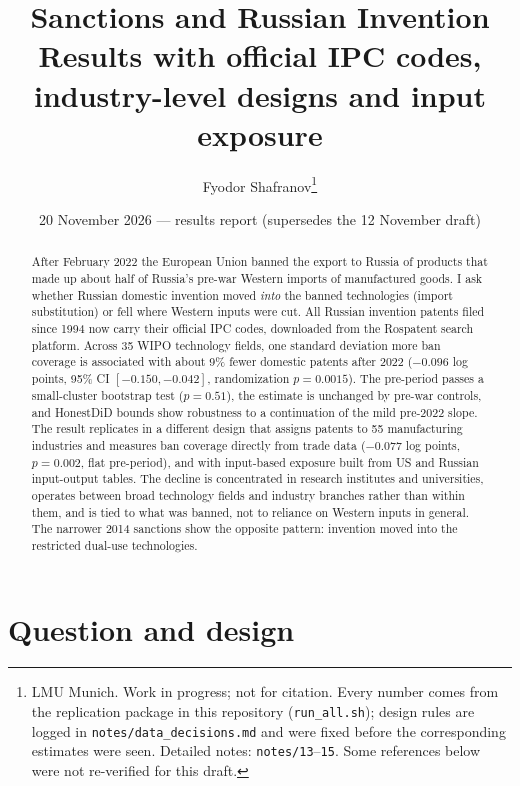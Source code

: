 \documentclass[11pt,a4paper]{article}
\title{\textbf{Sanctions and Russian Invention}\\[0.3em]
\large Results with official IPC codes, industry-level designs and input exposure}
\author{Fyodor Shafranov\thanks{LMU Munich. Work in progress; not for citation. Every number comes from the
replication package in this repository (\texttt{run\_all.sh}); design rules are logged in
\texttt{notes/data\_decisions.md} and were fixed before the corresponding estimates were seen. Detailed notes:
\texttt{notes/13}--\texttt{15}. Some references below were not re-verified for this draft.}}
\date{20 November 2026 --- results report (supersedes the 12 November draft)}
\begin{document}
\maketitle

\begin{abstract}
\noindent
After February 2022 the European Union banned the export to Russia of products that made up about half of Russia's
pre-war Western imports of manufactured goods. I ask whether Russian domestic invention moved \emph{into} the banned
technologies (import substitution) or fell where Western inputs were cut. All Russian invention patents filed since
1994 now carry their official IPC codes, downloaded from the Rospatent search platform. Across 35 WIPO technology
fields, one standard deviation more ban coverage is associated with about 9\% fewer domestic patents after 2022
($-0.096$ log points, 95\% CI $[-0.150, -0.042]$, randomization $p=0.0015$). The pre-period passes a small-cluster bootstrap test
($p=0.51$), the estimate is unchanged by pre-war controls, and HonestDiD bounds show robustness to a continuation of
the mild pre-2022 slope. The result replicates in a different design that assigns patents to 55 manufacturing
industries and measures ban coverage directly from trade data ($-0.077$ log points, $p=0.002$, flat pre-period), and with
input-based exposure built from US and Russian input-output tables. The decline is concentrated in research
institutes and universities, operates between broad technology fields and industry branches rather than within them,
and is tied to what was banned, not to reliance on Western inputs in general. The narrower 2014 sanctions show the
opposite pattern: invention moved into the restricted dual-use technologies.
\end{abstract}

\section{Question and design}
\end{document}
